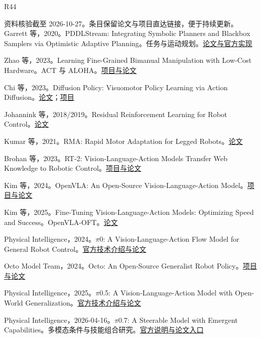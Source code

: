 \documentclass[UTF8,a4paper,11pt,oneside,openany,fontset=none]{ctexbook}
\begin{document}
\begin{thebibliography}{R44}
\small
\item[] 资料核验截至 2026-10-27。条目保留论文与项目直达链接，便于持续更新。
 Garrett 等，2020。PDDLStream: Integrating Symbolic Planners and Blackbox Samplers via Optimistic Adaptive Planning。任务与运动规划。\href{https://github.com/caelan/pddlstream}{论文与官方实现}

 Zhao 等，2023。Learning Fine-Grained Bimanual Manipulation with Low-Cost Hardware。ACT 与 ALOHA。\href{https://tonyzhaozh.github.io/aloha/}{项目与论文}

 Chi 等，2023。Diffusion Policy: Visuomotor Policy Learning via Action Diffusion。\href{https://arxiv.org/abs/2303.04137}{论文}；\href{https://diffusion-policy.cs.columbia.edu/}{项目}

 Johannink 等，2018/2019。Residual Reinforcement Learning for Robot Control。\href{https://arxiv.org/abs/1812.03201}{论文}

 Kumar 等，2021。RMA: Rapid Motor Adaptation for Legged Robots。\href{https://arxiv.org/abs/2107.04034}{论文}

 Brohan 等，2023。RT-2: Vision-Language-Action Models Transfer Web Knowledge to Robotic Control。\href{https://robotics-transformer2.github.io/}{项目与论文}

 Kim 等，2024。OpenVLA: An Open-Source Vision-Language-Action Model。\href{https://openvla.github.io/}{项目与论文}

 Kim 等，2025。Fine-Tuning Vision-Language-Action Models: Optimizing Speed and Success。OpenVLA-OFT。\href{https://arxiv.org/abs/2502.19645}{论文}

 Physical Intelligence，2024。\(\pi\)0: A Vision-Language-Action Flow Model for General Robot Control。\href{https://www.pi.website/blog/pi0}{官方技术介绍与论文}

 Octo Model Team，2024。Octo: An Open-Source Generalist Robot Policy。\href{https://octo-models.github.io/}{项目与论文}

 Physical Intelligence，2025。\(\pi\)0.5: A Vision-Language-Action Model with Open-World Generalization。\href{https://www.pi.website/blog/pi05}{官方技术介绍与论文}

 Physical Intelligence，2026-04-16。\(\pi\)0.7: A Steerable Model with Emergent Capabilities。多模态条件与技能组合研究。\href{https://www.pi.website/blog/pi07}{官方说明与论文入口}


\end{thebibliography}
\end{document}
